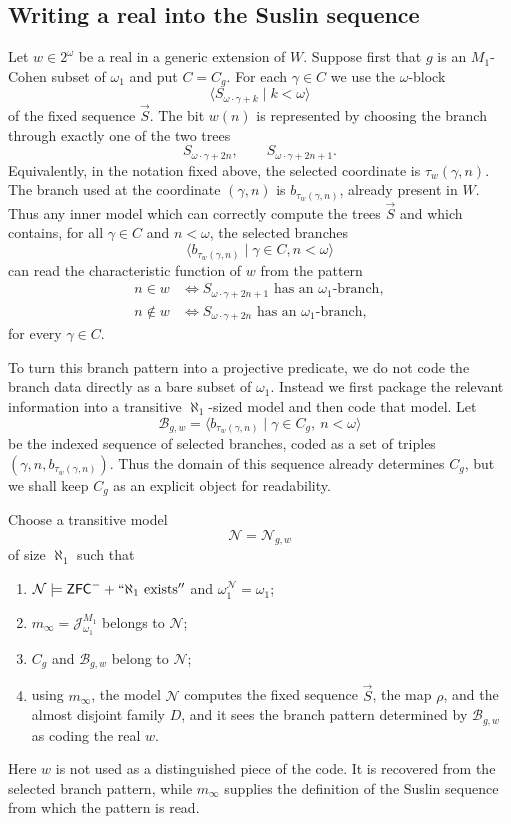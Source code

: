 \documentclass[a4paper,11pt]{article}
\newcommand{\ZFC}{\mathsf{ZFC}}
\begin{document}
\subsection{Writing a real into the Suslin sequence}

Let $w\in2^\omega$ be a real in a generic extension of $W$.  Suppose first that $g$ is an $M_1$-Cohen subset of $\omega_1$ and put $C=C_g$.  For each $\gamma\in C$ we use the $\omega$-block
\[
   \langle S_{\omega\cdot\gamma+k}\mid k<\omega\rangle
\]
of the fixed sequence $\vec S$.  The bit $w(n)$ is represented by choosing the branch through exactly one of the two trees
\[
   S_{\omega\cdot\gamma+2n},\qquad S_{\omega\cdot\gamma+2n+1}.
\]
Equivalently, in the notation fixed above, the selected coordinate is
\(\tau_w(\gamma,n)\).  The branch used at the coordinate \((\gamma,n)\) is
\(b_{\tau_w(\gamma,n)}\), already present in \(W\).  Thus any inner model which can correctly compute the trees $\vec S$ and which contains, for all $\gamma\in C$ and $n<\omega$, the selected branches
\[
   \langle b_{\tau_w(\gamma,n)}\mid \gamma\in C,
      n<\omega\rangle
\]
can read the characteristic function of $w$ from the pattern
\begin{align*}
   n\in w
   &\Longleftrightarrow S_{\omega\cdot\gamma+2n+1}
      \text{ has an }\omega_1\text{-branch},\\
   n\notin w
   &\Longleftrightarrow S_{\omega\cdot\gamma+2n}
      \text{ has an }\omega_1\text{-branch},
\end{align*}
for every $\gamma\in C$.

To turn this branch pattern into a projective predicate, we do not code the branch data directly as a bare subset of $\omega_1$.  Instead we first package the relevant information into a transitive $\aleph_1$-sized model and then code that model.  Let
\[
   \mathcal B_{g,w}=\langle b_{\tau_w(\gamma,n)}
      \mid \gamma\in C_g,\ n<\omega\rangle
\]
be the indexed sequence of selected branches, coded as a set of triples
$(\gamma,n,b_{\tau_w(\gamma,n)})$.  Thus the domain of this sequence already determines $C_g$, but we shall keep $C_g$ as an explicit object for readability.

Choose a transitive model
\[
   \mathcal N=\mathcal N_{g,w}
\]
of size $\aleph_1$ such that
\begin{enumerate}
   \item $\mathcal N\models\ZFC^-+``\aleph_1\text{ exists}''$ and $\omega_1^{\mathcal N}=\omega_1$;
   \item $m_\infty=\mathcal J^{M_1}_{\omega_1}$ belongs to $\mathcal N$;
   \item $C_g$ and $\mathcal B_{g,w}$ belong to $\mathcal N$;
   \item using $m_\infty$, the model $\mathcal N$ computes the fixed sequence $\vec S$, the map $\rho$, and the almost disjoint family $D$, and it sees the branch pattern determined by $\mathcal B_{g,w}$ as coding the real $w$.
\end{enumerate}
Here $w$ is not used as a distinguished piece of the code.  It is recovered from the selected branch pattern, while $m_\infty$ supplies the definition of the Suslin sequence from which the pattern is read.
\end{document}
